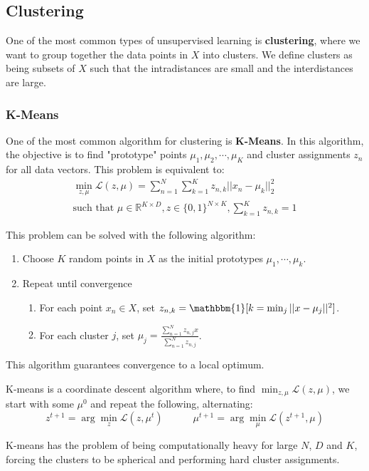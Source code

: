 \documentclass{article}
\newcommand{\R}{\mathbb{R}}
\newcommand{\ind}{\mathbbm{1}}
\newcommand{\loss}{\mathcal{L}}
\begin{document}
\subsection{Clustering}

One of the most common types of unsupervised learning is \textbf{clustering}, where we want to group together the data points in $X$ into clusters.
We define clusters as being subsets of $X$ such that the intradistances are small and the interdistances are large.

\subsubsection{K-Means}

One of the most common algorithm for clustering is \textbf{K-Means}.
In this algorithm, the objective is to find "prototype" points $\mu_1, \mu_2, \cdots, \mu_K$ and cluster assignments $z_n$ for all data vectors.
This problem is equivalent to:
\begin{gather*}
\min_{z, \mu} \loss(z, \mu) = \sum_{n=1}^N \sum_{k=1}^K z_{n,k} ||x_n - \mu_k||_2^2 \\
\text{such that } \mu \in \R^{K \times D}, z \in \{0,1\}^{N \times K}, \sum_{k=1}^K z_{n,k} = 1 
\end{gather*}

This problem can be solved with the following algorithm:
\begin{enumerate}
    \item Choose $K$ random points in $X$ as the initial prototypes $\mu_1, \cdots, \mu_k$.
    \item Repeat until convergence
    \begin{enumerate}
	\item For each point $x_n \in X$, set $z_{n,k} = \ind [k = \min_j ||x-\mu_j||^2]$.
	\item For each cluster $j$, set $\mu_j = \frac{\sum_{n=1}^N z_{n,j} x}{\sum_{n=1}^N z_{n,j}}$.
    \end{enumerate}
\end{enumerate}

This algorithm guarantees convergence to a local optimum.

K-means is a coordinate descent algorithm where, to find $\min_{z, \mu} \loss(z, \mu)$, we start with some $\mu^0$ and repeat the following, alternating:
$$
z^{t+1} = \arg \min_z \loss(z, \mu^t) \quad \quad \quad
\mu^{t+1} = \arg \min_\mu \loss(z^{t+1}, \mu)
$$

K-means has the problem of being computationally heavy for large $N$, $D$ and $K$, forcing the clusters to be spherical and performing hard cluster assignments.
\end{document}
